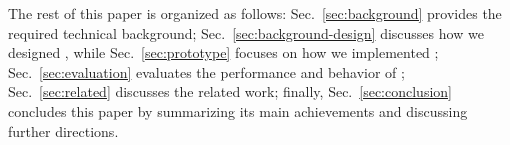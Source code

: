 
The rest of this paper is organized as follows: Sec.~\ref{sec:background}
provides the required technical background; Sec.~\ref{sec:background-design}
discusses how we designed \tcpls, while Sec.~\ref{sec:prototype} focuses on how
we implemented \tcpls; Sec.~\ref{sec:evaluation} evaluates the performance and
behavior of \tcpls; Sec.~\ref{sec:related} discusses the related work;  finally, Sec.~\ref{sec:conclusion} concludes this paper by
summarizing its main achievements and discussing further directions.  

